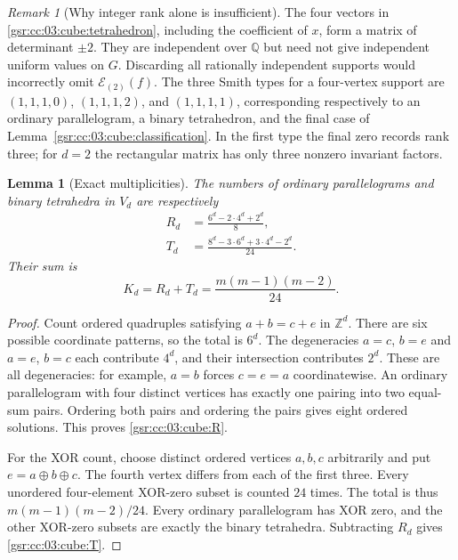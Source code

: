 \documentclass[11pt,letterpaper]{article}
\numberwithin{equation}{section}
\newtheorem{lemma}[theorem]{Lemma}
\theoremstyle{definition}
\theoremstyle{remark}
\newtheorem{remark}[theorem]{Remark}
\newcommand{\Z}{\mathbb Z}
\newcommand{\Q}{\mathbb Q}
\newcommand{\1}{\mathbf 1}
\begin{document}
\begin{remark}[Why integer rank alone is insufficient]
\label{gsr:cc:03:cube:detremark}
The four vectors in \eqref{gsr:cc:03:cube:tetrahedron}, including the coefficient
of $x$, form a matrix of determinant $\pm2$.  They are independent
over $\Q$ but need not give independent uniform values on $G$.
Discarding all rationally independent supports would incorrectly omit
$\mathcal E_{(2)}(f)$.  The three Smith types for a four-vertex support
are $(1,1,1,0)$, $(1,1,1,2)$, and $(1,1,1,1)$, corresponding respectively
to an ordinary parallelogram, a binary tetrahedron, and the final case
of Lemma~\ref{gsr:cc:03:cube:classification}.  In the first type the final zero
records rank three; for $d=2$ the rectangular matrix has only three
nonzero invariant factors.
\end{remark}

\begin{lemma}[Exact multiplicities]
\label{gsr:cc:03:cube:counts}
The numbers of ordinary parallelograms and binary tetrahedra in $V_d$
are respectively
\begin{align}
 R_d&=\frac{6^d-2\cdot4^d+2^d}{8},\label{gsr:cc:03:cube:R}\\
 T_d&=\frac{8^d-3\cdot6^d+3\cdot4^d-2^d}{24}.
 \label{gsr:cc:03:cube:T}
\end{align}
Their sum is
\begin{equation}
 K_d=R_d+T_d=\frac{m(m-1)(m-2)}{24}.
 \label{gsr:cc:03:cube:K}
\end{equation}
\end{lemma}

\begin{proof}
Count ordered quadruples satisfying $a+b=c+e$ in $\Z^d$.
There are six possible coordinate patterns, so the total is $6^d$.
The degeneracies $a=c$, $b=e$ and $a=e$, $b=c$ each contribute $4^d$,
and their intersection contributes $2^d$.  These are all degeneracies:
for example, $a=b$ forces $c=e=a$ coordinatewise.  An ordinary
parallelogram with four distinct vertices has exactly one pairing into
two equal-sum pairs.  Ordering both pairs and ordering the pairs gives
eight ordered solutions.  This proves \eqref{gsr:cc:03:cube:R}.

For the XOR count, choose distinct ordered vertices $a,b,c$ arbitrarily
and put $e=a\oplus b\oplus c$.  The fourth vertex differs from each
of the first three.  Every unordered four-element XOR-zero subset is
counted $24$ times.  The total is thus $m(m-1)(m-2)/24$.
Every ordinary parallelogram has XOR zero, and the other XOR-zero
subsets are exactly the binary tetrahedra.  Subtracting $R_d$ gives
\eqref{gsr:cc:03:cube:T}.
\end{proof}
\end{document}
